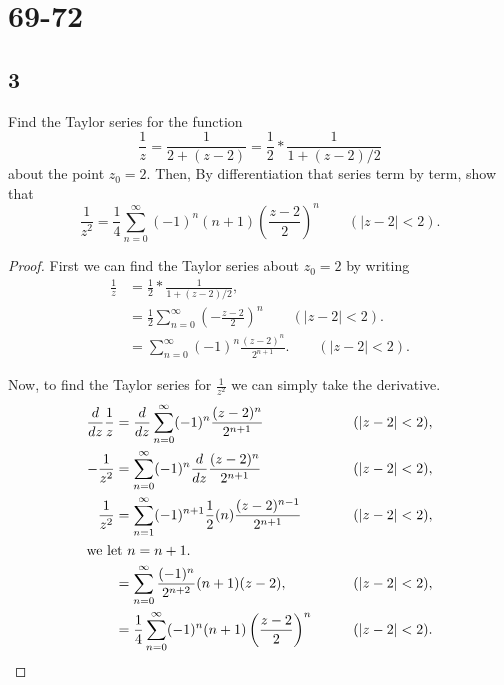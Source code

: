 \documentclass{article}
\begin{document}
\section*{69-72}
\subsection*{3}
Find the Taylor series for the function
\[\frac{1}{z}=\frac{1}{2 + (z-2)}=\frac{1}{2}*\frac{1}{1+(z-2)/2}\]
about the point $z_0=2$. Then, By differentiation that series term by term, show
that
\[\frac{1}{z^2} = \frac{1}{4}\sum_{n=0}^\infty (-1)^n(n+1)\left(\frac{z-2}{2}\right)^n
    \qquad (|z-2|<2).\]
\begin{proof}
    First we can find the Taylor series about $z_0=2$ by writing
    \begin{align*}
        \frac{1}{z} & = \frac{1}{2}*\frac{1}{1+(z-2)/2},                           \\
                    & = \frac{1}{2}\sum_{n=0}^\infty \left(-\frac{z-2}{2}\right)^n
        \qquad (|z-2|<2).                                                          \\
                    & = \sum_{n=0}^\infty (-1)^n\frac{(z-2)^n}{2^{n+1}}.
        \qquad (|z-2|<2).
    \end{align*}

    Now, to find the Taylor series for $\frac{1}{z^2}$ we can simply take the
    derivative.
    \begin{align*}
        \frac{d}{dz}\frac{1}{z} & = \frac{d}{dz}\sum_{n=0}^\infty (-1)^n\frac{(z-2)^n}{2^{n+1}}
                                & \qquad (|z-2|<2),                                                       \\
        -\frac{1}{z^2}          & = \sum_{n=0}^\infty (-1)^n\frac{d}{dz}\frac{(z-2)^n}{2^{n+1}}
                                & \qquad (|z-2|<2),                                                       \\
        \frac{1}{z^2}           & = \sum_{n=1}^\infty (-1)^{n+1}\frac{1}{2}(n)\frac{(z-2)^{n-1}}{2^{n+1}}
                                & \qquad (|z-2|<2),                                                       \\
        \intertext{we let $n=n+1$.}
                                & = \sum_{n=0}^\infty \frac{(-1)^n}{2^{n+2}} (n+1)(z-2),
                                & \qquad (|z-2|<2),                                                       \\
                                & = \frac{1}{4}\sum_{n=0}^\infty (-1)^n(n+1)\left(\frac{z-2}{2}\right)^n
                                & \qquad (|z-2|<2).                                                       \\
    \end{align*}
\end{proof}
\end{document}
